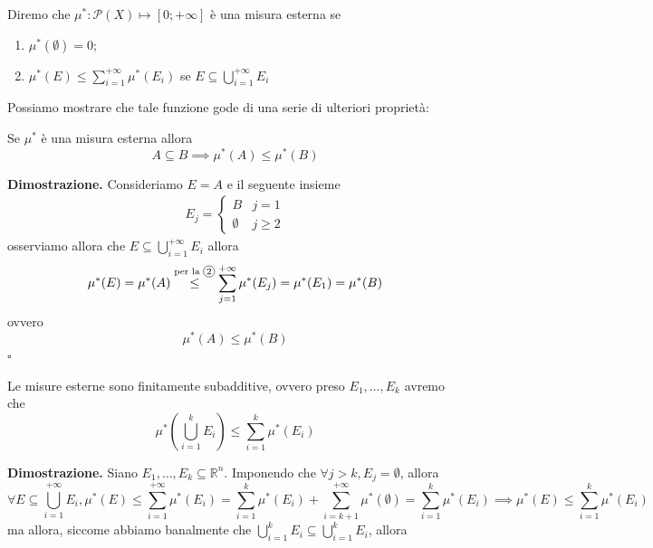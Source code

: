 %
\vspace{0.5cm}
\begin{definition}
	Diremo che $\mu^*: \mathcal{P}(X) \mapsto [0; +\infty]$ è una misura esterna se
	\begin{enumerate}[label=\protect\circled{\arabic*}]
		\item $\mu^*(\emptyset) = 0$;
		\item $\mu^*(E) \leq \sum\limits_{i=1}^{+\infty} \mu^*(E_i)$ se $E \subseteq \bigcup\limits_{i=1}^{+\infty} E_i$
	\end{enumerate}
\end{definition}
%
Possiamo mostrare che tale funzione gode di una serie di ulteriori proprietà:
%
\vspace{0.5cm}
\begin{prop}[\textcolor{blue}{monotonia della misura esterna}]
	Se $\mu^*$ è una misura esterna allora
	$$
	A \subseteq B \implies \mu^*(A) \leq \mu^*(B)
	$$
	\label{prop:monotonia}
\end{prop}
%
\noindent \textbf{Dimostrazione. }
	Consideriamo $E = A$ e il seguente insieme
	\[\begin{aligned}
	E_j = \begin{cases} B & j=1 \\ \emptyset & j \geq 2	\end{cases}
	\end{aligned}\]
	osserviamo allora che $E \subseteq \bigcup\limits_{i=1}^{+\infty} E_i$ allora
	$$
	\mu^*(E) = \mu^*(A) \stackrel{\text{per la \circled{2}}}{\leq} \sum_{j=1}^{+\infty} \mu^*(E_j) = \mu^*(E_1) = \mu^*(B)
	$$
	ovvero
	$$
	\mu^*(A) \leq \mu^*(B)
	$$
\hfill $\square$
%
\vspace{0.5cm}
\begin{prop}[\textcolor{blue}{subadditività finita}]
	Le misure esterne sono finitamente subadditive, ovvero preso $E_1, \ldots, E_k$ avremo che 
	$$
	\mu^* \left( \bigcup_{i=1}^{k} E_i \right) \leq \sum_{i=1}^k \mu^*(E_i)
	$$
	\label{prop:sub_finita}
\end{prop}
%
\noindent \textbf{Dimostrazione. }
	Siano $E_1, \ldots, E_k \subseteq \mathbb{R}^n$. Imponendo che $\forall j > k, E_j = \emptyset$, allora
	$$
	\forall E \subseteq \bigcup_{i=1}^{+\infty} E_i, \mu^*(E) \leq \sum_{i=1}^{+\infty} \mu^*(E_i) = \sum\limits_{i=1}^{k} \mu^*(E_i) + \sum\limits_{i=k+1}^{+\infty} \mu^*(\emptyset) = \sum\limits_{i=1}^k \mu^*(E_i) \implies \mu^*(E) \leq \sum_{i=1}^k \mu^*(E_i)
	$$
	ma allora, siccome abbiamo banalmente che $\bigcup\limits_{i=1}^{k} E_i \subseteq \bigcup\limits_{i=1}^k E_i$, allora

